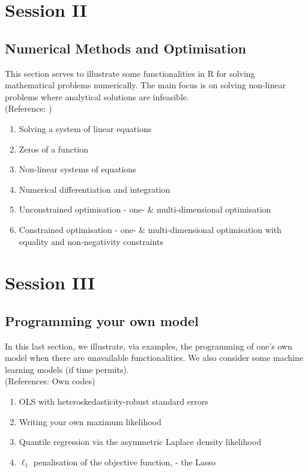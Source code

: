 \documentclass[12pt,a4paper]{article}
\begin{document}
	\section{Session II}

	\subsection{Numerical Methods and Optimisation}
	This section serves to illustrate some functionalities in R for solving mathematical problems numerically. The main focus is on solving non-linear problems where analytical solutions are infeasible. \\(Reference: \cite{bloomfield2014using})
	
	\begin{enumerate}[label=(\alph*)]
		\item Solving a system of linear equations
		\item Zeros of a function
		\item Non-linear systems of equations
		\item Numerical differentiation and integration
		\item Unconstrained optimisation - one- \& multi-dimensional optimisation
		\item Constrained optimisation - one- \& multi-dimensional optimisation with equality and non-negativity constraints
	\end{enumerate}
	
	\section{Session III}
	\subsection{Programming your own model}
	In this last section, we illustrate, via examples, the programming of one's own model when there are unavailable functionalities. We also consider some machine learning models (if time permits).\\
	(References: Own codes)
	
	\begin{enumerate}[label=(\alph*)]
		\item OLS with heteroskedasticity-robust standard errors
		\item Writing your own maximum likelihood
		\item Quantile regression via the asymmetric Laplace density likelihood
		\item $ \ell_1 $ penalisation of the objective function, - the Lasso
	\end{enumerate}
	
\end{document}
